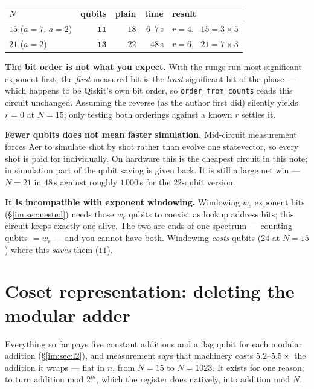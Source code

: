 \documentclass[11pt]{article}
\newcommand{\code}[1]{\texttt{#1}}
\theoremstyle{plain}
\theoremstyle{remark}
\begin{document}
\begin{center}\small
\begin{tabular}{@{}lrrrl@{}}
\toprule
$N$ & qubits & plain & time & result\\
\midrule
$15$ ($a=7$, $a=2$) & $\mathbf{11}$ & $18$ & $6$--$7$\,s & $r=4$, \ $15=3\times5$\\
$21$ ($a=2$)        & $\mathbf{13}$ & $22$ & $48$\,s & $r=6$, \ $21=7\times3$\\
\bottomrule
\end{tabular}
\end{center}

\begin{warnbox}[title={Three things that bite}]
\textbf{The bit order is not what you expect.} With the rungs run most-significant-exponent first,
the \emph{first} measured bit is the \emph{least} significant bit of the phase --- which happens to
be Qiskit's own bit order, so \code{order\_from\_counts} reads this circuit unchanged. Assuming the
reverse (as the author first did) silently yields $r=0$ at $N=15$; only testing both orderings
against a known $r$ settles it.

\textbf{Fewer qubits does not mean faster simulation.} Mid-circuit measurement forces Aer to
simulate shot by shot rather than evolve one statevector, so every shot is paid for individually.
On hardware this is the cheapest circuit in this note; in simulation part of the qubit saving is
given back. It is still a large net win --- $N=21$ in $48$\,s against roughly $1\,000$\,s for the
$22$-qubit version.

\textbf{It is incompatible with exponent windowing.} Windowing $w_e$ exponent bits
(\S\ref{im:sec:nested}) needs those $w_e$ qubits to coexist as lookup address bits; this circuit
keeps exactly one alive. The two are ends of one spectrum --- counting qubits $=w_e$ --- and you
cannot have both. Windowing \emph{costs} qubits ($24$ at $N=15$) where this \emph{saves} them
($11$).
\end{warnbox}

\section{Coset representation: deleting the modular adder}\label{sec:coset}

Everything so far pays five constant additions and a flag qubit for each modular addition
(\S\ref{im:sec:l2}), and measurement says that machinery costs $5.2$--$5.5\times$ the addition it
wraps --- flat in $n$, from $N=15$ to $N=1023$. It exists for one reason: to turn addition
mod $2^m$, which the register does natively, into addition mod $N$.
\end{document}
